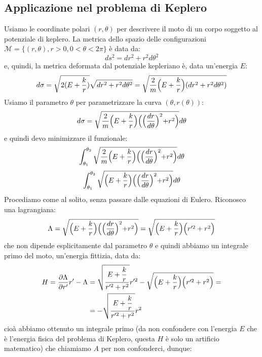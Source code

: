 \documentclass[a4paper,openany]{article}
\begin{document}
	\subsection{Applicazione nel problema di Keplero}
	Usiamo le coordinate polari $(r,\theta)$ per descrivere il moto di un corpo soggetto al potenziale di keplero. La metrica dello spazio delle configurazioni $\mathcal{M} = \{(r,\theta), r>0, 0 <\theta < 2\pi\}$ è data da:
	$$
	ds^2 = dr^2 + r^2d\theta^2
	$$
	e, quindi, la metrica deformata dal potenziale kepleriano è, data un'energia $E$:
	$$
	d\sigma = \sqrt{2(E+\dfrac{k}{r})} \sqrt{dr^2 + r^2d\theta^2} = \sqrt{\dfrac{2}{m}\Bigl(E+\dfrac{k}{r}\Bigl)(dr^2 + r^2d\theta^2)}
	$$
	Usiamo il parametro $\theta$ per parametrizzare la curva $(\theta, r(\theta))$:
	\begin{equation}\label{key}
		d\sigma =  \sqrt{\dfrac{2}{m}\Bigl(E+\dfrac{k}{r}\Bigl)\Bigl(\Bigl(\dfrac{dr}{d\theta}\Bigl)^2 + r^2\Bigl)}d\theta
	\end{equation}
e quindi devo minimizzare il funzionale:
\begin{equation}\label{key}
	\int_{\theta_1}^{\theta_2} \sqrt{\dfrac{2}{m}\Bigl(E+\dfrac{k}{r}\Bigl)\Bigl(\Bigl(\dfrac{dr}{d\theta}\Bigl)^2 + r^2\Bigl)}d\theta 
\end{equation}
\begin{equation}\label{key}
	\int_{\theta_1}^{\theta_2} \sqrt{\Bigl(E+\dfrac{k}{r}\Bigl)\Bigl(\Bigl(\dfrac{dr}{d\theta}\Bigl)^2 + r^2\Bigl)}d\theta 
\end{equation}
Procediamo come al solito, senza passare dalle equazioni di Eulero. Riconosco una lagrangiana:
\begin{equation}\label{key}
	\Lambda = \sqrt{\Bigl(E+\dfrac{k}{r}\Bigl)\Bigl(\Bigl(\dfrac{dr}{d\theta}\Bigl)^2 + r^2\Bigl)}= \sqrt{\Bigl(E+\dfrac{k}{r}\Bigl)\Bigl(r'^2 + r^2\Bigl)}
\end{equation}
che non dipende esplicitamente dal parametro $\theta$ e quindi abbiamo un integrale primo del moto, un'energia fittizia, data da:
\begin{equation}\label{key}
	\begin{aligned}
	H = \dfrac{\partial\Lambda}{\partial r'}r'-\Lambda &= \sqrt{\dfrac{E+\dfrac{k}{r}}{r'^2+r^2}}r'^2 -  \sqrt{\Bigl(E+\dfrac{k}{r}\Bigl)\Bigl(r'^2 + r^2\Bigl)} = \\
	&= - \sqrt{\dfrac{E+\dfrac{k}{r}}{r'^2+r^2}}r^2
	\end{aligned}
\end{equation}
cioà abbiamo ottenuto un integrale primo (da non confondere con l'energia $E$ che è l'energia fisica del problema di Keplero, questa $H$ è solo un artificio matematico) che chiamiamo $A$ per non confonderci, dunque:
\end{document}
